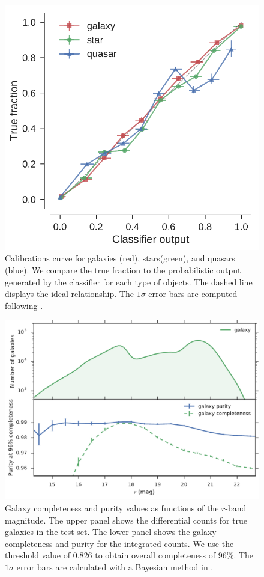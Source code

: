 \begin{figure}
  \centering
  \includegraphics[width=\columnwidth]{figures/calibration_curve.pdf}
  \caption{
    Calibrations curve for galaxies (red), stars(green), and quasars (blue).
    We compare the true fraction to the probabilistic output generated by the classifier for each type
    of objects.
    The dashed line displays the ideal relationship.
    The $1 \sigma$ error bars are computed following \citet{paterno2004calculating}.}
  \label{fig:calibration_curve}
\end{figure}

\begin{figure}
  \centering
  \includegraphics[width=\columnwidth]{figures/gal_comp_pur.pdf}
  \caption{
    Galaxy completeness and purity values as functions of the $r$-band magnitude.
    The upper panel shows the differential counts for true galaxies in the test set.
    The lower panel shows the galaxy completeness and purity for the integrated counts.
    We use the threshold value of 0.826 to obtain overall completeness of $96\%$.
    The $1 \sigma$ error bars are calculated with a Bayesian method in
    \citet{paterno2004calculating}.}
  \label{fig:gal_comp_pur}
\end{figure}

